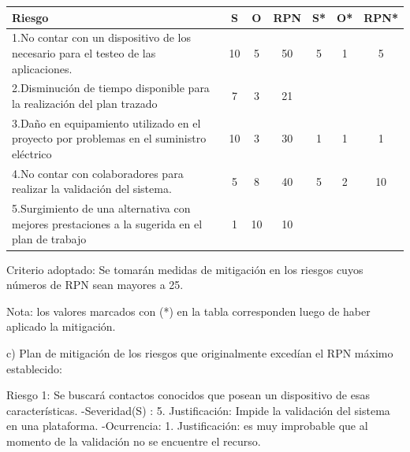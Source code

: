 \documentclass[
11pt, %
]{charter}
\begin{document}
\begin{table}[htpb]
\centering
\begin{tabularx}{\linewidth}{@{}|X|c|c|c|c|c|c|@{}}
\hline
\rowcolor[HTML]{C0C0C0} 
Riesgo & S & O & RPN & S* & O* & RPN* \\ \hline
1.No contar con un dispositivo de los necesario para el testeo de las aplicaciones.    &   10 & 5  &  50  &  5  & 1   & 5   \\ \hline
2.Disminución de tiempo disponible para la realización del plan trazado       & 7  & 3  & 21    &    &    &      \\ \hline
3.Daño en equipamiento utilizado en el proyecto por problemas en el suministro eléctrico       & 10  & 3  & 30    &  1  &   1 &     1 \\ \hline
4.No contar con colaboradores para realizar la validación del sistema.     & 5  & 8 & 40    &  5  &  2  &    10  \\ \hline
5.Surgimiento de una alternativa con mejores prestaciones a la sugerida en el plan de trabajo       & 1  & 10 & 10    &    &    &      \\ \hline
\end{tabularx}%
\end{table}

Criterio adoptado: 
Se tomarán medidas de mitigación en los riesgos cuyos números de RPN sean mayores a 25.

Nota: los valores marcados con (*) en la tabla corresponden luego de haber aplicado la mitigación.

c) Plan de mitigación de los riesgos que originalmente excedían el RPN máximo establecido:
 
          
Riesgo 1: Se buscará contactos conocidos que posean un dispositivo de esas características.\newline
-Severidad(S) : 5.\newline
	Justificación: Impide la validación del sistema en una plataforma.\newline
-Ocurrencia: 1.\newline
	Justificación: es muy improbable que al momento de la validación no se encuentre el recurso.
\end{document}

